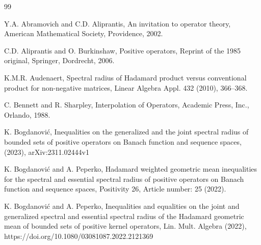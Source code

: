 \documentclass[12pt, reqno]{amsart}
\theoremstyle{definition}
\theoremstyle{remark}
\numberwithin{equation}{section}
\begin{document}

\begin{thebibliography}{99}

 Y.A. Abramovich and C.D. Aliprantis,
 An invitation to operator theory, American Mathematical Society, Providence, 2002.

 C.D. Aliprantis and O. Burkinshaw,  Positive operators,
Reprint of the 1985 original, Springer, Dordrecht, 2006.

 K.M.R. Audenaert, Spectral radius of Hadamard product versus conventional product for non-negative matrices,
Linear Algebra Appl. 432 (2010), 366--368.%




 C. Bennett and R. Sharpley,  Interpolation of Operators,
         Academic Press, Inc., Orlando, 1988.


 K. Bogdanovi\'{c},  Inequalities on the generalized and the joint spectral radius of bounded sets of positive operators on Banach function and sequence spaces, (2023), arXiv:2311.02444v1
        
        
 K. Bogdanovi\'{c} and A. Peperko,  Hadamard weighted geometric mean inequalities for the spectral and essential spectral radius of positive operators on Banach function and sequence spaces, Positivity 26, Article number: 25 (2022). %

 K. Bogdanovi\'{c} and A. Peperko, Inequalities and equalities on the joint and
generalized spectral and essential spectral radius
of the Hadamard geometric mean of bounded sets
of positive kernel operators,  Lin. Mult. Algebra (2022), https://doi.org/10.1080/03081087.2022.2121369



\end{thebibliography}
\end{document}
